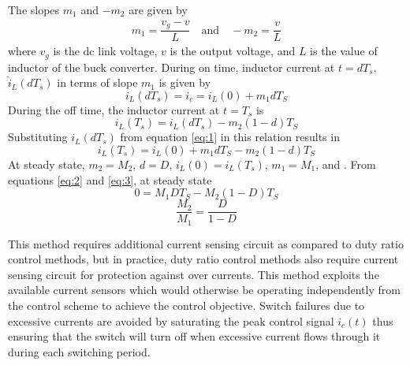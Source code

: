 	The slopes $m_1$ and $-m_2$ are given by \cite{book:941109}
	\begin{align}
		m_1 = \dfrac{v_g-v}{L} \quad \text{and} \quad  -m_2=\dfrac{v}{L}
		\label{eq:1}
	\end{align}
	where $v_g$ is the dc link voltage, $v$ is the output voltage, and $L$ is the value of inductor of the buck converter.
	During on time, inductor current at $t=dT_s$, $\hat{i}_L(dT_s)$ in terms of slope $m_1$ is given by
	\begin{equation}
		i_L(dT_s) = i_c = i_L(0)+m_1dT_S
		\label{eq:2}
	\end{equation}
	During the off time, the inductor current at $t=T_s$ is 
	\begin{equation*}
		i_L(T_s) = i_L(dT_s) - m_2(1-d)T_S
	\end{equation*}
	Substituting $i_L(dT_s)$ from equation \eqref{eq:1} in this relation results in
	\begin{equation}
		i_L(T_s) = i_L(0)+m_1dT_S - m_2(1-d)T_S
		\label{eq:3}
	\end{equation}
	At steady state, $m_2=M_2$, $d=D$, $i_L(0) = i_L(T_s)$, $m_1=M_1$, and . From equations \eqref{eq:2} and \eqref{eq:3}, at steady state
	\begin{equation*}
		0 = M_1DT_S - M_2(1-D)T_S
	\end{equation*}
	\begin{equation}
		\dfrac{M_2}{M_1} = \dfrac{D}{1-D}
		\label{eq:4}
	\end{equation}

	This method requires additional current sensing circuit as compared to duty ratio control methods, but in practice, duty ratio control methods also require current sensing circuit for protection against over currents. This method exploits the available current sensors which would otherwise be operating independently from the control scheme to achieve the control objective. Switch failures due to excessive currents are avoided by saturating the peak control signal $i_c(t)$ thus ensuring that the switch will turn off when excessive current flows through it during each switching period.

